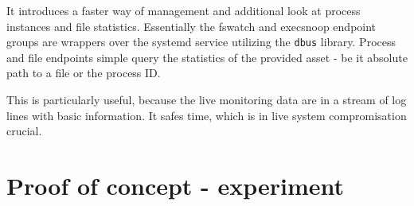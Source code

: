 It introduces a faster way of management and additional look at process instances and file statistics. Essentially the fswatch and execsnoop endpoint groups are wrappers over the systemd service utilizing the \texttt{dbus} library. Process and file endpoints simple query the statistics of the provided asset - be it absolute path to a file or the process ID.

This is particularly useful, because the live monitoring data are in a stream of log lines with basic information. It safes time, which is in live system compromisation crucial.

\section{Proof of concept - experiment \label{implementation:poc}}
